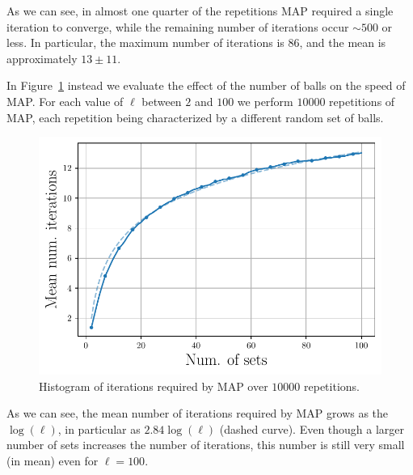 \documentclass{article}
\begin{document}
As we can see, in almost one quarter of the repetitions MAP required a single iteration to converge, while the remaining number of iterations occur $\sim 500$ or less. In particular, the maximum number of iterations is $86$, and the mean is approximately $13 \pm 11$.

In Figure~\ref{fig:map-changing-d} instead we evaluate the effect of the number of balls on the speed of MAP. For each value of $\ell$ between $2$ and $100$ we perform $10000$ repetitions of MAP, each repetition being characterized by a different random set of balls.

\begin{figure}[!ht]
\centering
\includegraphics[width = 0.9\columnwidth]{Figures/MAP_changing_d}
\caption{Histogram of iterations required by MAP over $10000$ repetitions.}
\label{fig:map-changing-d}
\end{figure}

As we can see, the mean number of iterations required by MAP grows as the $\log(\ell)$, in particular as $2.84 \log(\ell)$ (dashed curve). Even though a larger number of sets increases the number of iterations, this number is still very small (in mean) even for $\ell = 100$.





\end{document}
